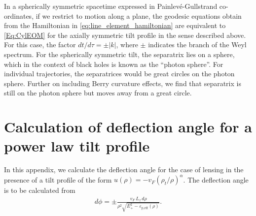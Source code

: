 \documentclass[submission, Phys]{SciPost}
\begin{document}
\begin{appendix}
In a spherically symmetric spacetime expressed in Painlev\'e-Gullstrand co-ordinates, if we restrict to motion along a plane, the geodesic equations obtain from the Hamiltonian in \cref{eq:line_element_hamiltonian} are equivalent to \cref{Eq:CylEOM} for the axially symmetric tilt profile in the sense described above.
For this case, the factor  $dt/d\tau=\pm |k|$, where $\pm$ indicates the branch of the Weyl spectrum.
For the spherically symmetric tilt, the separatrix lies on a sphere, which in the context of black holes is known as the ``photon sphere''.
For individual trajectories, the separatrices would be great circles on the photon sphere.
Further on including Berry curvature effects, we find that separatrix is still on the photon sphere but moves away from a great circle.



\section{Calculation of deflection angle for a power law tilt profile}
\label{Sec:append_Deflection}
In this appendix, we calculate the deflection angle for the case of lensing in the presence of a tilt profile of the form $u(\rho)=-v_F({\rho_t}/{\rho})^\alpha$. The deflection angle is to be calculated from
\begin{align}
    d\phi = \pm \frac{v_F \,L_z \, d\rho}{\rho^2\sqrt{E^2_+-\varepsilon_{\text{p,eff}}(\rho)}}.
\end{align}


\end{appendix}
\end{document}

